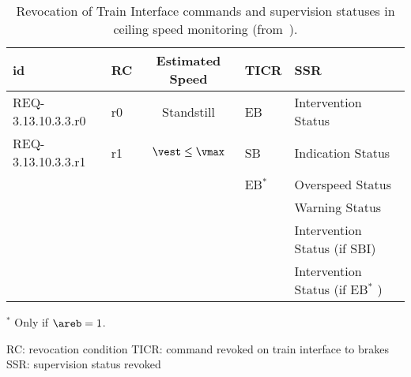 \begin{table}
\caption{Revocation of Train Interface commands and supervision
  statuses in ceiling speed monitoring
  (from~\cite[Table~6]{ETCSSRS-Principles}).}


\begin{minipage}{\textwidth}
\centering
\begin{tabular}{|l|l|c|l|l|}
\hline\hline
{\bf id} & {\bf RC} & {\bf Estimated Speed} & {\bf TICR} & {\bf SSR}
\\\hline\hline
REQ-3.13.10.3.3.r0 & r0 & Standstill & EB & Intervention Status
\\\hline
REQ-3.13.10.3.3.r1 & r1 & $\vest \le \vmax$ & SB  &
Indication Status \\
& & & EB$^*$ &
Overspeed Status\\
& & &  &
Warning Status \\
& & &  &
Intervention Status (if SBI) \\
& & &  &
Intervention Status (if EB$^*$ )\\
\hline
\hline
\end{tabular}
\end{minipage}

$^*$ Only if $\areb = 1$.
\normalsize

RC: revocation condition \newline
TICR: command revoked on train interface to brakes \newline
SSR: supervision status revoked


\label{tab:six}
\end{table}%



